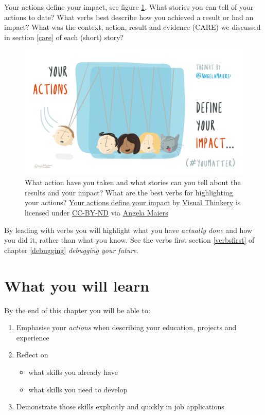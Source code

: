 \documentclass[
]{book}
\providecommand{\tightlist}{%
  \setlength{\itemsep}{0pt}\setlength{\parskip}{0pt}}
\begin{document}
Your actions define your impact, see figure \ref{fig:action-fig}. What stories you can tell of your actions to date? What verbs best describe how you achieved a result or had an impact? What was the context, action, result and evidence (CARE) we discussed in section \ref{care} of each (short) story?

\begin{figure}

{\centering \includegraphics[width=1\linewidth]{images/your-actions} 

}

\caption{What action have you taken and what stories can you tell about the results and your impact? What are the best verbs for highlighting your actions? \href{https://bryanmmathers.com/your-actions-define-your-impact/}{Your actions define your impact} by \href{https://visualthinkery.com/}{Visual Thinkery} is licensed under \href{https://creativecommons.org/licenses/by-nd/4.0/}{CC-BY-ND} via \href{https://twitter.com/AngelaMaiers}{Angela Maiers}}\label{fig:action-fig}
\end{figure}



By leading with verbs you will highlight what you have \emph{actually done} and how you did it, rather than what you know. See the verbs first section \ref{verbsfirst} of chapter \ref{debugging} \emph{debugging your future}.

\hypertarget{ilo17}{%
\section{What you will learn}\label{ilo17}}

By the end of this chapter you will be able to:

\begin{enumerate}
\def\labelenumi{\arabic{enumi}.}
\tightlist
\item
  Emphasise your \emph{actions} when describing your education, projects and experience
\item
  Reflect on

  \begin{itemize}
  \tightlist
  \item
    what skills you already have
  \item
    what skills you need to develop
  \end{itemize}
\item
  Demonstrate those skills explicitly and quickly in job applications
\end{enumerate}
\end{document}
